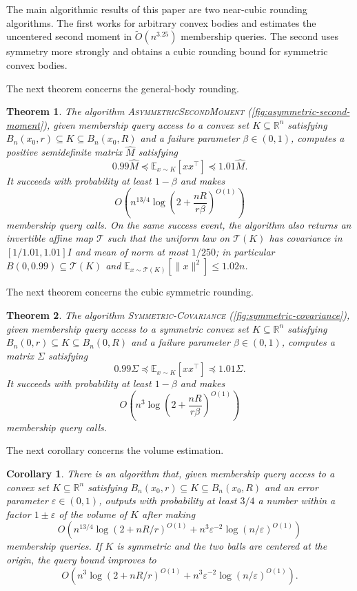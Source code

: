 \documentclass[11pt]{article}
\numberwithin{equation}{section}
\newtheorem{theorem}{Theorem}
\newtheorem{corollary}[corollary]{Corollary}
\theoremstyle{definition}
\newcommand{\eps}{\varepsilon}
\newcommand{\R}{\mathbb{R}}
\renewcommand{\O}{\widetilde{O}}
\newcommand{\E}[2]{\mathbb{E}_{#1}\left[#2\right]}
\newcommand{\algname}[1]{\textnormal{\textsc{#1}}}
\begin{document}
The main algorithmic results of this paper are two near-cubic rounding
algorithms.
The first works for arbitrary convex bodies and estimates the uncentered second
moment in $\O(n^{3.25})$ membership queries.
The second uses symmetry more strongly and obtains a cubic rounding bound for
symmetric convex bodies.

The next theorem concerns the general-body rounding.

\begin{theorem}
\label{thm:general-upper-bound}
The algorithm \algname{AsymmetricSecondMoment}
(\cref{fig:asymmetric-second-moment}), given membership query access to a convex
set $K \subseteq \R^n$ satisfying
$B_n(x_0, r) \subseteq K \subseteq B_n(x_0, R)$ and a failure parameter
$\beta \in (0,1)$, computes a positive semidefinite matrix
$\widehat M$ satisfying
\[
0.99\widehat M
\preceq \E{x \sim K}{xx^\top}
\preceq 1.01\widehat M.
\]
It succeeds with probability at least $1-\beta$ and makes
\[
O\left(n^{13/4}\log\left(2+\frac{nR}{r\beta}\right)^{O(1)}\right)
\]
membership query calls.
On the same success event, the algorithm also returns an invertible affine map
$\mathcal T$ such that the uniform law on
$\mathcal T(K)$ has covariance in
$[1/1.01,1.01]I$ and mean of norm at most
$1/250$; in particular
$B(0,0.99)\subseteq\mathcal T(K)$ and
$\E{x\sim\mathcal T(K)}{\|x\|^2}\leq1.02n$.
\end{theorem}

The next theorem concerns the cubic symmetric rounding.

\begin{theorem}
\label{thm:symmetric-upper-bound}
The algorithm \algname{Symmetric-Covariance} (\cref{fig:symmetric-covariance}),
given membership query access to a \emph{symmetric} convex set
$K \subseteq \R^n$ satisfying
$B_n(0, r) \subseteq K \subseteq B_n(0, R)$ and a failure parameter
$\beta \in (0,1)$, computes a matrix
$\Sigma$ satisfying
\[
0.99\Sigma
\preceq \E{x \sim K}{xx^\top}
\preceq 1.01\Sigma.
\]
It succeeds with probability at least $1-\beta$ and makes
\[
O\left(n^3\log\left(2+\frac{nR}{r\beta}\right)^{O(1)}\right)
\]
membership query calls.
\end{theorem}

The next corollary concerns the volume estimation.

\begin{corollary}
\label{cor:volume}
There is an algorithm that, given membership query access to a convex set
$K \subseteq \R^n$ satisfying
$B_n(x_0, r) \subseteq K \subseteq B_n(x_0, R)$ and an error parameter
$\eps \in (0,1)$, outputs with probability at least
$3/4$ a number within a factor
$1\pm\eps$ of the volume of
$K$ after making
\[
O\left(n^{13/4}\log(2+nR/r)^{O(1)} + n^3\eps^{-2}\log(n/\eps)^{O(1)}\right)
\]
membership queries.
If $K$ is symmetric and the two balls are centered at the origin, the query
bound improves to
\[
O\left(n^3\log(2+nR/r)^{O(1)} + n^3\eps^{-2}\log(n/\eps)^{O(1)}\right).
\]
\end{corollary}
\end{document}
